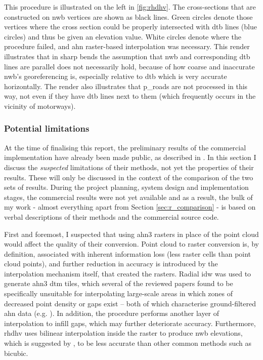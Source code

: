 This procedure is illustrated on the left in \ref{fig:rhdhv}. The cross-sections that are constructed on \ac{nwb} vertices are shown as black lines. Green circles denote those vertices where the cross section could be properly intersected with \ac{dtb} lines (blue circles) and thus be given an elevation value. White circles denote where the procedure failed, and \ac{ahn} raster-based interpolation was necessary. This render illustrates that in sharp bends the assumption that \ac{nwb} and corresponding \ac{dtb} lines are parallel does not necessarily hold, because of how coarse and inaccurate \ac{nwb}'s georeferencing is, especially relative to \ac{dtb} which is very accurate horizontally. The render also illustrates that \ac{p_roads} are not processed in this way, not even if they have \ac{dtb} lines next to them (which frequently occurs in the vicinity of motorways).

\subsubsection{Potential limitations}

At the time of finalising this report, the preliminary results of the commercial implementation have already been made public, as described in \cite{nwb_hoogte}. In this section I discuss the \textit{suspected} limitations of their methods, not yet the properties of their results. These will only be discussed in the context of the comparison of the two sets of results. During the project planning, system design and implementation stages, the commercial results were not yet available and as a result, the bulk of my work - almost everything apart from Section \ref{sec:r_comparison} - is based on verbal descriptions of their methods and the commercial source code.

First and foremost, I suspected that using \ac{ahn3} rasters in place of the point cloud would affect the quality of their conversion. Point cloud to raster conversion is, by definition, associated with inherent information loss (less raster cells than point cloud points), and further reduction in accuracy is introduced by the interpolation mechanism itself, that created the rasters. Radial \ac{idw} was used to generate \ac{ahn3} \ac{dtm} tiles, which several of the reviewed papers found to be specifically unsuitable for interpolating large-scale areas in which zones of decreased point density or gaps exist – both of which characterise ground-filtered \ac{ahn} data (e.g. \cite{guo_etal_2010}). In addition, the procedure performs another layer of interpolation to infill gaps, which may further deteriorate accuracy. Furthermore, \ac{rhdhv} uses bilinear interpolation inside the raster to produce \ac{nwb} elevations, which is suggested by \cite{shi_etal_2005}, to be less accurate than other common methods such as bicubic.

